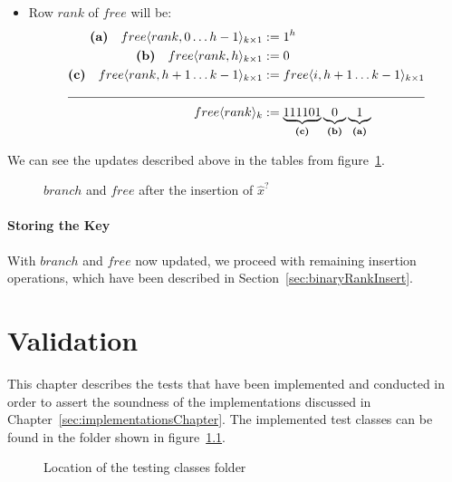 \begin{enumerate}
\begin{itemize}
        \item
        Row $rank$ of $free$ will be:
        \begin{align*}
            \textbf{(a)}\quad free\langle rank, 0 \dots h - 1 \rangle_{k \times 1} &:= 1^h \\
            \textbf{(b)}\quad free\langle rank, h\rangle_{k \times 1} &:= 0 \\
            \textbf{(c)}\quad free\langle rank, h + 1 \dots k - 1\rangle_{k \times 1} &:= free\langle i, h + 1 \dots k - 1\rangle_{k \times 1} \\
            \cline{1-2}
            free\langle rank \rangle_k &:=\underbrace{111101}_{\textbf{(c)}} \underbrace{0}_{\textbf{(b)}} \underbrace{1}_{\textbf{(a)}}
        \end{align*}
    \end{itemize}

    We can see the updates described above in the tables from figure~\ref{fig:branchAndFreeAfterUpdatingValuesForRank}.
    \begin{figure}[H]
    \centering
    
    \caption[Example of $branch$ and $free$ after the insertion of a $\hat x^?$ ]{$branch$ and $free$ after the insertion of $\hat x^?$}
    \label{fig:branchAndFreeAfterUpdatingValuesForRank}
    \end{figure}
    
\end{enumerate}

\subsubsection{Storing the Key} \label{sec:dontCaresInsert}

With $branch$ and $free$ now updated, we proceed with remaining insertion operations, which have been described in Section~\ref{sec:binaryRankInsert}.

\chapter{Validation} \label{sec:validationChapter}

This chapter describes the tests that have been implemented and conducted in order to assert the soundness of the implementations discussed in Chapter~\ref{sec:implementationsChapter}.
The implemented test classes can be found in the folder shown in figure~\ref{fig:testFolderTree}.
\begin{figure}[H]
    \caption{Location of the testing classes folder}
    \label{fig:testFolderTree}
\end{figure}

